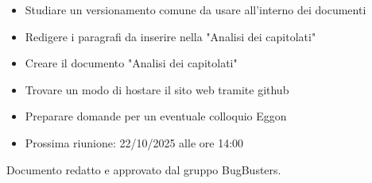 \documentclass[a4paper,12pt]{article}
\begin{document}
\begin{tcolorbox}[colback=secondaryblue!8,colframe=secondaryblue!60,arc=2mm,boxrule=0.5pt,left=10pt,right=10pt]
\begin{itemize}[topsep=5pt]
    \item Studiare un versionamento comune da usare all'interno dei documenti
    \item Redigere i paragrafi da inserire nella "Analisi dei capitolati" 
    \item Creare il documento "Analisi dei capitolati"
    \item Trovare un modo di hostare il sito web tramite github
    \item Preparare domande per un eventuale colloquio Eggon
    \item Prossima riunione: 22/10/2025 alle ore 14:00
\end{itemize}
\end{tcolorbox}

\vfill
\begin{center}
    {\small\color{darkgray} Documento redatto e approvato dal gruppo BugBusters.}
\end{center}
\end{document}
